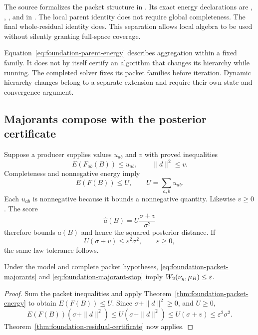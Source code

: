 The source formalizes the packet structure in . Its exact energy declarations are , , , and  in . The local parent identity does not require global completeness. The final whole-residual identity does. This separation allows local algebra to be used without silently granting full-space coverage.

Equation~\eqref{eq:foundation-parent-energy} describes aggregation within a fixed family. It does not by itself certify an algorithm that changes its hierarchy while running. The completed solver fixes its packet families before iteration. Dynamic hierarchy changes belong to a separate extension and require their own state and convergence argument.

\subsection{Majorants compose with the posterior certificate}

Suppose a producer supplies values $u_{ab}$ and $v$ with proved inequalities
\begin{equation}
 E(F_{ab}(B))\le u_{ab},\qquad \|d\|^2\le v.
 \label{eq:foundation-packet-majorants}
\end{equation}
Completeness and nonnegative energy imply
\[
 E(F(B))\le U,\qquad U=\sum_{a,b}u_{ab}.
\]
Each $u_{ab}$ is nonnegative because it bounds a nonnegative quantity. Likewise $v\ge0$. The score
\begin{equation}
 \widehat a(B)=U\frac{\sigma+v}{\sigma^2}
 \label{eq:foundation-majorant-score}
\end{equation}
therefore bounds $a(B)$ and hence the squared posterior distance. If
\begin{equation}
 U(\sigma+v)\le\varepsilon^2\sigma^2,\qquad\varepsilon\ge0,
 \label{eq:foundation-majorant-stop}
\end{equation}
the same law tolerance follows.

\begin{corollary}
\label{cor:foundation-packet-tolerance}
Under the model and complete packet hypotheses, \eqref{eq:foundation-packet-majorants} and \eqref{eq:foundation-majorant-stop} imply $W_2(\nu_y,\mu_B)\le\varepsilon$.
\end{corollary}
\begin{proof}
Sum the packet inequalities and apply Theorem~\ref{thm:foundation-packet-energy} to obtain $E(F(B))\le U$. Since $\sigma+\|d\|^2\ge0$, and $U\ge0$,
\[
 E(F(B))(\sigma+\|d\|^2)
 \le U(\sigma+\|d\|^2)
 \le U(\sigma+v)
 \le\varepsilon^2\sigma^2.
\]
Theorem~\ref{thm:foundation-residual-certificate} now applies.
\end{proof}

